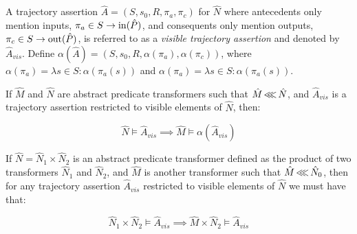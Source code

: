 A trajectory assertion $\hat A = (S, s_{0}, R, \pi_{a}, \pi_{c})$ for $\hat N$ where antecedents only mention inputs, $\pi_{a} \in S \rightarrow \operatorname{in}(\hat P)$, and consequents only mention outputs, $\pi_{c} \in S \rightarrow \operatorname{out}(\hat P)$, is referred to as a \textit{visible trajectory assertion} and denoted by $\hat A_{vis}$. Define $\alpha(\hat A) = (S, s_{0}, R, \alpha(\pi_{a}), \alpha(\pi_{c}))$, where $\alpha(\pi_{a}) = \lambda s \in S : \alpha(\pi_{a}(s))$ and $\alpha(\pi_{a}) = \lambda s \in S : \alpha(\pi_{a}(s))$.



\begin{theorem}
\label{thm:refinement}
If $\hat M$ and $\hat N$ are abstract predicate transformers such that $\hat M \operatorname{\lll} \hat N$, and $\hat A_{vis}$ is a trajectory assertion restricted to visible elements of $\hat N$, then:

\begin{equation*}
\hat N \models \hat A_{vis} \implies \hat M \models \alpha(\hat A_{vis})
\end{equation*}
\end{theorem}

\begin{corollary}
\label{thm:refinement-product}
If $\hat N = \hat N_{1} \times \hat N_{2}$ is an abstract predicate transformer defined as the product of two transformers $\hat N_{1}$ and $\hat N_{2}$, and $\hat M$ is another transformer such that $\hat M \operatorname{\lll} \hat N_{0}$, then for any trajectory assertion $\hat A_{vis}$ restricted to visible elements of $\hat N$ we must have that:

\begin{equation*}
\hat N_{1} \times \hat N_{2} \models \hat A_{vis} \implies \hat M \times \hat N_{2} \models \hat A_{vis}
\end{equation*}
\end{corollary}



